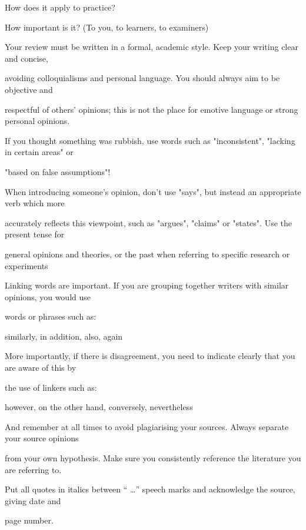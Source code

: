 How does it apply to practice?

How important is it? (To you, to learners, to examiners)

Your review must be written in a formal, academic style. Keep your writing clear and concise, 

avoiding colloquialisms and personal language. You should always aim to be objective and 

respectful of others' opinions; this is not the place for emotive language or strong personal opinions. 

If you thought something was rubbish, use words such as "inconsistent", "lacking in certain areas" or 

"based on false assumptions"! 

When introducing someone's opinion, don't use "says", but instead an appropriate verb which more 

accurately reflects this viewpoint, such as "argues", "claims" or "states". Use the present tense for 

general opinions and theories, or the past when referring to specific research or experiments

Linking words are important. If you are grouping together writers with similar opinions, you would use 

words or phrases such as:

similarly, in addition, also, again

More importantly, if there is disagreement, you need to indicate clearly that you are aware of this by 

the use of linkers such as:

however, on the other hand, conversely, nevertheless

And remember at all times to avoid plagiarising your sources. Always separate your source opinions 

from your own hypothesis. Make sure you consistently reference the literature you are referring to. 

Put all quotes in italics between “ …” speech marks and acknowledge the source, giving date and 

page number.
